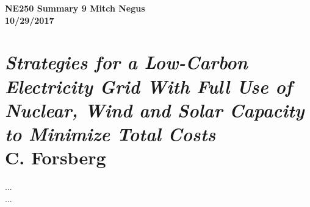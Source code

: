 \documentclass{report}
\newcommand{\tab}{\-\hspace{1cm}}
\begin{document}
\thispagestyle{empty}

{\bf {\large {NE250 Summary {9} \hfill Mitch Negus\\
		\hspace*{\fill} 10/29/2017\\ }}}
\section*{\textsl{Strategies for a Low-Carbon Electricity Grid With Full Use of Nuclear, Wind and Solar Capacity to Minimize Total Costs} \\ \normalsize C. Forsberg}

\tab ... \\
\tab ...
\end{document}
